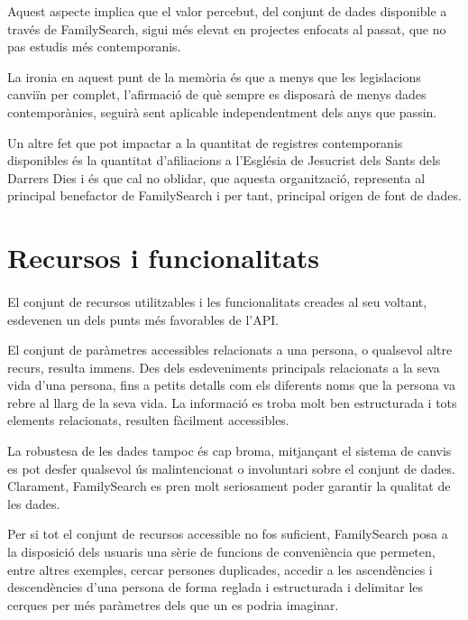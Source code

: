     Aquest aspecte implica que el valor percebut, del conjunt de dades disponible a través de FamilySearch, sigui més elevat en projectes enfocats al passat, que no pas estudis més contemporanis.

    La ironia en aquest punt de la memòria és que a menys que les legislacions canviïn  per complet, l'afirmació de què sempre es disposarà de menys dades contemporànies, seguirà sent aplicable independentment dels anys que passin.

    Un altre fet que pot impactar a la quantitat de registres contemporanis disponibles és la quantitat d'afiliacions a l'Església de Jesucrist dels Sants dels Darrers Dies i és que cal no oblidar, que aquesta organització, representa al principal benefactor de FamilySearch i per tant, principal origen de font de dades.


\section{Recursos i funcionalitats}

    \paragraph{}
    El conjunt de recursos utilitzables i les funcionalitats creades al seu voltant, esdevenen un dels punts més favorables de l'API.

    El conjunt de paràmetres accessibles relacionats a una persona, o qualsevol altre recurs, resulta immens. Des dels esdeveniments principals relacionats a la seva vida d'una persona, fins a petits detalls com els diferents noms que la persona va rebre al llarg de la seva vida. La informació es troba molt ben estructurada i tots elements relacionats, resulten fàcilment accessibles.

    La robustesa de les dades tampoc és cap broma, mitjançant el sistema de canvis es pot desfer qualsevol ús malintencionat o involuntari sobre el conjunt de dades. Clarament, FamilySearch es pren molt seriosament poder garantir la qualitat de les dades.

    Per si tot el conjunt de recursos accessible no fos suficient, FamilySearch posa a la disposició dels usuaris una sèrie de funcions de conveniència que permeten, entre altres exemples, cercar persones duplicades, accedir a les ascendències i descendències d'una persona de forma reglada i estructurada i delimitar les cerques per més paràmetres dels que un es podria imaginar.

